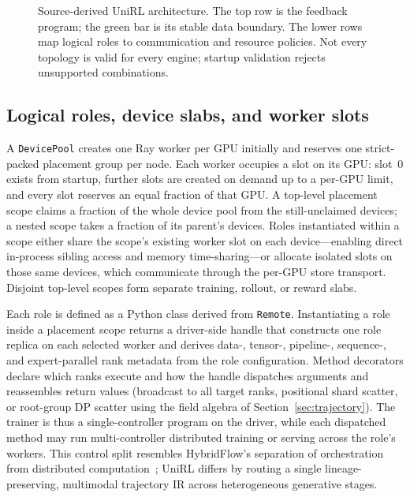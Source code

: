 \documentclass[10pt]{article}
\newcommand{\system}{UniRL\xspace}
\begin{document}
\begin{figure}[H]
{}
\caption{Source-derived UniRL architecture. The top row is the feedback program; the green bar is its stable data boundary. The lower rows map logical roles to communication and resource policies. Not every topology is valid for every engine; startup validation rejects unsupported combinations.}
\label{fig:architecture}
\end{figure}

\subsection{Logical roles, device slabs, and worker slots}

A \texttt{DevicePool} creates one Ray worker per GPU initially and reserves one strict-packed placement group per node.
Each worker occupies a slot on its GPU: slot~0 exists from startup, further slots are created on demand up to a per-GPU limit, and every slot reserves an equal fraction of that GPU.
A top-level placement scope claims a fraction of the whole device pool from the still-unclaimed devices; a nested scope takes a fraction of its parent's devices.
Roles instantiated within a scope either share the scope's existing worker slot on each device---enabling direct in-process sibling access and memory time-sharing---or allocate isolated slots on those same devices, which communicate through the per-GPU store transport.
Disjoint top-level scopes form separate training, rollout, or reward slabs.

Each role is defined as a Python class derived from \texttt{Remote}.
Instantiating a role inside a placement scope returns a driver-side handle that constructs one role replica on each selected worker and derives data-, tensor-, pipeline-, sequence-, and expert-parallel rank metadata from the role configuration.
Method decorators declare which ranks execute and how the handle dispatches arguments and reassembles return values (broadcast to all target ranks, positional shard scatter, or root-group DP scatter using the field algebra of Section~\ref{sec:trajectory}).
The trainer is thus a single-controller program on the driver, while each dispatched method may run multi-controller distributed training or serving across the role's workers.
This control split resembles HybridFlow's separation of orchestration from distributed computation~\citep{sheng2024hybridflow}; \system differs by routing a single lineage-preserving, multimodal trajectory IR across heterogeneous generative stages.
\end{document}
